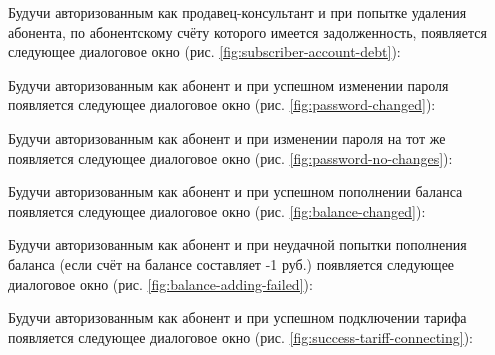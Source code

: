 Будучи авторизованным как продавец-консультант и при попытке удаления абонента, по абонентскому счёту которого имеется задолженность, появляется следующее диалоговое окно (рис. \ref{fig:subscriber-account-debt}):

Будучи авторизованным как абонент и при успешном изменении пароля появляется следующее диалоговое окно (рис. \ref{fig:password-changed}):

Будучи авторизованным как абонент и при изменении пароля на тот же появляется следующее диалоговое окно (рис. \ref{fig:password-no-changes}):

Будучи авторизованным как абонент и при успешном пополнении баланса появляется следующее диалоговое окно (рис. \ref{fig:balance-changed}):

Будучи авторизованным как абонент и при неудачной попытки пополнения баланса (если счёт на балансе составляет -1 руб.) появляется следующее диалоговое окно (рис. \ref{fig:balance-adding-failed}):

Будучи авторизованным как абонент и при успешном подключении тарифа появляется следующее диалоговое окно (рис. \ref{fig:success-tariff-connecting}):
